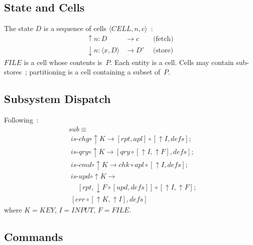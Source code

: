 \documentclass[acmsmall,screen,review]{acmart}
\begin{document}
\subsection{State and Cells}

The state $D$ is a sequence of cells $\langle\mathit{CELL}, n, c\rangle$~\cite[Sec.\,14.3]{backus78}:
\begin{align}
\uparrow\!n\!:\!D &\to c \qquad \text{(fetch)} \label{eq:fetch} \\
\downarrow\!n\!:\!\langle x, D\rangle &\to D' \quad\; \text{(store)} \label{eq:store}
\end{align}
$\mathit{FILE}$ is a cell whose contents is~$P$. Each entity is a cell. Cells may contain sub-stores~\cite[Sec.\,14.7]{backus78}; partitioning is a cell containing a subset of~$P$.

\subsection{Subsystem Dispatch}

Following~\cite[Sec.\,14.4.2]{backus78}:
\begin{align}
&\mathit{sub} \equiv \nonumber \\
&\; \mathit{is\text{-}chg} \circ \uparrow\!\mathit{K} \to [\mathit{rpt}, \mathit{apl}] \circ [\uparrow\!\mathit{I}, \mathit{defs}]; \nonumber \\
&\; \mathit{is\text{-}qry} \circ \uparrow\!\mathit{K} \to [\mathit{qry} \circ [\uparrow\!\mathit{I}, \uparrow\!\mathit{F}], \mathit{defs}]; \nonumber \\
&\; \mathit{is\text{-}cmd} \circ \uparrow\!\mathit{K} \to \mathit{chk} \circ \mathit{apl} \circ [\uparrow\!\mathit{I}, \mathit{defs}]; \nonumber \\
&\; \mathit{is\text{-}upd} \circ \uparrow\!\mathit{K} \to \nonumber \\
&\;\quad [\mathit{rpt}, \downarrow\!\mathit{F} \circ [\mathit{upd}, \mathit{defs}]] \circ [\uparrow\!\mathit{I}, \uparrow\!\mathit{F}]; \nonumber \\
&\; [\mathit{err} \circ [\uparrow\!\mathit{K}, \uparrow\!\mathit{I}], \mathit{defs}] \label{eq:sub}
\end{align}
where $K = \mathit{KEY}$, $I = \mathit{INPUT}$, $F = \mathit{FILE}$.

\subsection{Commands}
\end{document}

